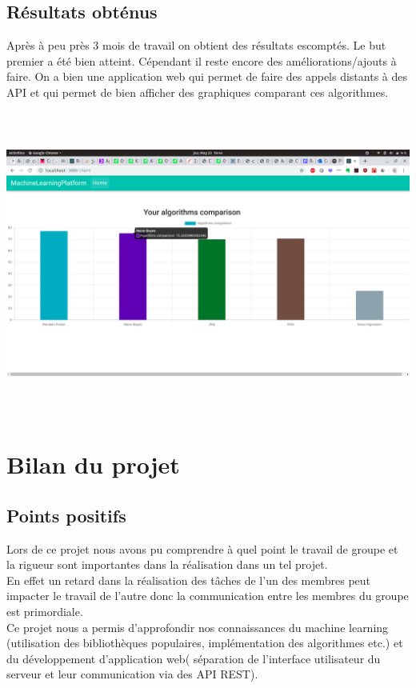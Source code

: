 \documentclass[a4paper,11pt]{article}
\begin{document}
\subsection{Résultats obténus}

Après à peu près 3 mois de travail on obtient des résultats escomptés.
Le but premier a été bien atteint. Cépendant il reste encore des améliorations/ajouts à faire.
On a bien une application web qui permet de faire des appels distants à des API et qui permet de bien afficher
des graphiques comparant ces algorithmes.

\includegraphics[width=17cm, height=10cm]{algoComparison.png}\\

    \section{Bilan du projet}
\subsection{Points positifs}
Lors de ce projet nous avons pu comprendre à quel point le travail de groupe et la rigueur sont importantes dans la réalisation dans un tel projet.\\
En effet un retard dans la réalisation des tâches de l’un des membres peut impacter
le travail de l’autre donc la communication entre les membres du groupe est primordiale.\\
Ce projet nous a permis d'approfondir nos connaissances du machine learning
(utilisation des bibliothèques populaires, implémentation des algorithmes etc.) et du développement
d'application web( séparation de l'interface utilisateur du serveur et leur communication via des API REST).
\end{document}

